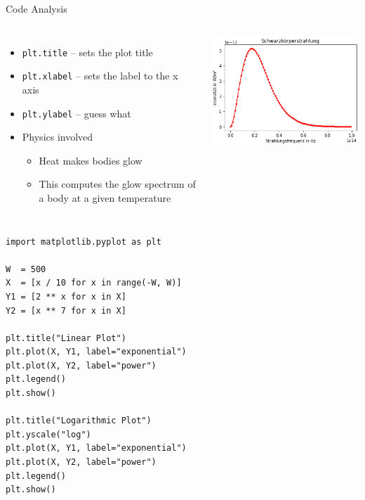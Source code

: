 \begin{frame}[fragile]{Code Analysis}
%
\begin{columns}[T]
\begin{itemize}
\item \texttt{plt.title} -- sets the plot title
\item \texttt{plt.xlabel} -- sets the label to the x axis
\item \texttt{plt.ylabel} -- guess what
\item Physics involved
	\begin{itemize}
	\item Heat makes bodies glow
	\item This computes the glow spectrum of a body at a given temperature
	\end{itemize}
\end{itemize}
%
\begin{tcolorbox}[title=Output: Headline and Axis Labels]
	\includegraphics[width=\linewidth]{./gfx/plt-labels}
\end{tcolorbox}
\end{columns}
%
\end{frame}


\begin{frame}[fragile]
%
\begin{codebox}
\begin{verbatim}
import matplotlib.pyplot as plt

W  = 500
X  = [x / 10 for x in range(-W, W)]
Y1 = [2 ** x for x in X]
Y2 = [x ** 7 for x in X]

plt.title("Linear Plot")
plt.plot(X, Y1, label="exponential")
plt.plot(X, Y2, label="power")
plt.legend()
plt.show()

plt.title("Logarithmic Plot")
plt.yscale("log")
plt.plot(X, Y1, label="exponential")
plt.plot(X, Y2, label="power")
plt.legend()
plt.show()
\end{verbatim}
\end{codebox}
%
\end{frame}

